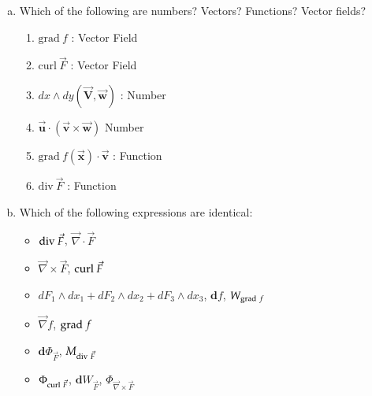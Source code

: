 \begin{enumerate}[a.]
	\item Which of the following are numbers? Vectors? Functions? Vector fields?
	
	\begin{enumerate}[i]
		\item $\mathrm{grad}\ f$ : Vector Field
		\item $\mathrm{curl}\ \vec{F}$ : Vector Field
		\item $dx\wedge dy(\vec{\bm{V}}, \vec{\bm{w}})$ : Number
		\item $\vec{\bm{u}}\cdot (\vec{\bm{v}}\times\vec{\bm{w}})$ Number
		\item $\mathrm{grad}\ f(\vec{\bm{x}})\cdot \vec{\bm{v}}$ : Function
		\item $\mathrm{div}\ \vec{F}$ : Function
	\end{enumerate}
	\item Which of the following expressions are identical: 
	
	\begin{itemize}
		\item $\mathrm{div}\  \vec{F}$, $\vec{\nabla}\cdot \vec{F}$
		\item $\vec{\nabla}\times \vec{F}$, $\mathrm{curl}\  \vec{F}$
		\item $dF_1\wedge dx_1 + dF_2\wedge dx_2 + dF_3\wedge dx_3$, $\bm{d}f$, $W_{\mathrm{grad}\  f}$
		\item $\vec{\nabla}f$, $\mathrm{grad}\  f$
		\item $\bm{d}\Phi_{\vec{F}}$, $M_{\mathrm{div}\  \vec{F}}$
		\item $\Phi_{\mathrm{curl}\  \vec{F}}$, $\bm{d}W_{\vec{F}}$, $\Phi_{\vec{\nabla}\times \vec{F}}$
	\end{itemize}
\end{enumerate}